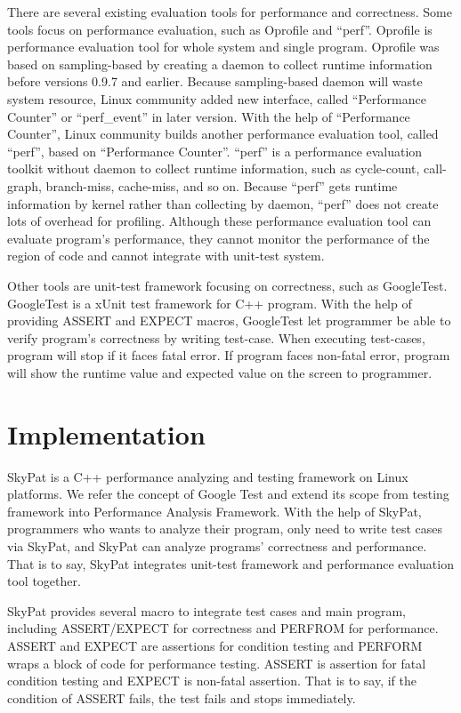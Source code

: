 \documentclass[final]{ols}
\begin{document}
There are several existing evaluation tools for performance and correctness.
Some tools focus on performance evaluation, such as Oprofile\cite{oprofile} and ``perf''. 
Oprofile is performance evaluation tool for whole system and single program.
Oprofile was based on sampling-based by creating a daemon to collect runtime information before versions 0.9.7 and earlier.
Because sampling-based daemon will waste system resource, Linux community added new interface, called ``Performance Counter''\cite{performance-counter-linux} or ``perf\_event'' in later version.
With the help of ``Performance Counter'', Linux community builds another performance evaluation tool, called ``perf'', based on ``Performance Counter''. 
``perf'' is a performance evaluation toolkit without daemon to collect runtime information, such as cycle-count, call-graph, branch-miss, cache-miss, and so on.
Because ``perf'' gets runtime information by kernel rather than collecting by daemon, ``perf'' does not create lots of overhead for profiling.
Although these performance evaluation tool can evaluate program's performance, they cannot monitor the performance of the region of code and cannot integrate with unit-test system.

Other tools are unit-test framework focusing on correctness, such as GoogleTest.
GoogleTest is a xUnit test framework for C++ program.
With the help of providing ASSERT and EXPECT macros, GoogleTest let programmer be able to verify program's correctness by writing test-case.
When executing test-cases, program will stop if it faces fatal error. 
If program faces non-fatal error, program will show the runtime value and expected value on the screen to programmer.

\section{Implementation}

SkyPat is a C++ performance analyzing and testing framework on Linux platforms. We refer the concept of Google Test and extend its scope from testing framework into Performance Analysis Framework.
With the help of SkyPat, programmers who wants to analyze their program, only need to write test cases via SkyPat, and SkyPat can analyze programs' correctness and performance. 
That is to say, SkyPat integrates unit-test framework and performance evaluation tool together.

SkyPat provides several macro to integrate test cases and main program, including ASSERT/EXPECT for correctness and PERFROM for performance.
ASSERT and EXPECT are assertions for condition testing and PERFORM wraps a block of code for performance testing. 
ASSERT is assertion for fatal condition testing and EXPECT is non-fatal assertion.
That is to say, if the condition of ASSERT fails, the test fails and stops immediately.
 
\end{document}
